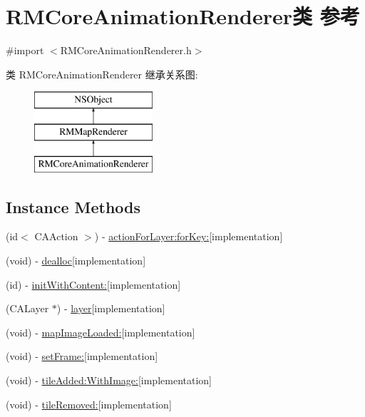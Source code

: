 \hypertarget{interface_r_m_core_animation_renderer}{\section{R\-M\-Core\-Animation\-Renderer类 参考}
\label{interface_r_m_core_animation_renderer}
}


{\ttfamily \#import $<$R\-M\-Core\-Animation\-Renderer.\-h$>$}

类 R\-M\-Core\-Animation\-Renderer 继承关系图\-:\begin{figure}[H]
\begin{center}
\leavevmode
\includegraphics[height=3.000000cm]{interface_r_m_core_animation_renderer}
\end{center}
\end{figure}
\subsection*{Instance Methods}
\begin{DoxyCompactItemize}
\item 
(id$<$ C\-A\-Action $>$) -\/ \hyperlink{interface_r_m_core_animation_renderer_a479b29d8a064a627dacb4e8754288f84}{action\-For\-Layer\-:for\-Key\-:}{\ttfamily  \mbox{[}implementation\mbox{]}}
\item 
(void) -\/ \hyperlink{interface_r_m_core_animation_renderer_a042e89d2923653a122204ce1fa2efa70}{dealloc}{\ttfamily  \mbox{[}implementation\mbox{]}}
\item 
(id) -\/ \hyperlink{interface_r_m_core_animation_renderer_a0a684a7d8ba7065b4223b3079d8c3483}{init\-With\-Content\-:}{\ttfamily  \mbox{[}implementation\mbox{]}}
\item 
(C\-A\-Layer $\ast$) -\/ \hyperlink{interface_r_m_core_animation_renderer_ab37d6e7a835c2d88bc51bd4a21d5f5ca}{layer}{\ttfamily  \mbox{[}implementation\mbox{]}}
\item 
(void) -\/ \hyperlink{interface_r_m_core_animation_renderer_a0bf0f1d99f3d6b98583ae637139e245a}{map\-Image\-Loaded\-:}{\ttfamily  \mbox{[}implementation\mbox{]}}
\item 
(void) -\/ \hyperlink{interface_r_m_core_animation_renderer_ad46d40355e2c34bcf66663d802118035}{set\-Frame\-:}{\ttfamily  \mbox{[}implementation\mbox{]}}
\item 
(void) -\/ \hyperlink{interface_r_m_core_animation_renderer_adcf1987f0c72eb304d9c77f7f19cebc0}{tile\-Added\-:\-With\-Image\-:}{\ttfamily  \mbox{[}implementation\mbox{]}}
\item 
(void) -\/ \hyperlink{interface_r_m_core_animation_renderer_a14bbf63db3a350caaaa8c7e74eec8f3e}{tile\-Removed\-:}{\ttfamily  \mbox{[}implementation\mbox{]}}
\end{DoxyCompactItemize}
